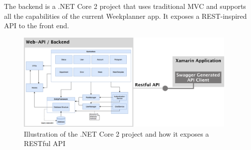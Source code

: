 The backend is a .NET Core 2 project that uses traditional MVC and supports all the capabilities of the current Weekplanner app. It exposes a REST-inspired API to the front end.
\begin{figure}[H]
        \begin{center}
            \includegraphics[width=0.95\textwidth]{figures/RestAPIFigure.pdf}
        \end{center}
        \caption{Illustration of the .NET Core 2 project and how it exposes a RESTful API}
        \label{fig:RestAPIFigure}
\end{figure}

